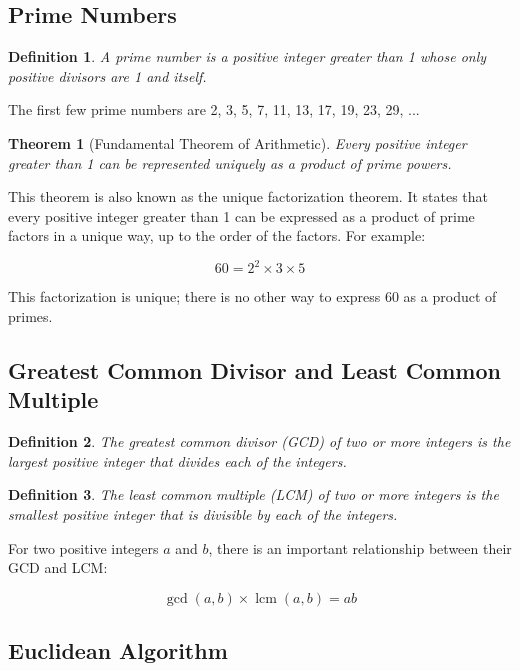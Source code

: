 \documentclass[12pt,a4paper]{article}
\DeclareMathOperator{\lcm}{lcm}
\newtheorem{definition}{Definition}
\newtheorem{theorem}{Theorem}
\begin{document}
\subsection{Prime Numbers}

\begin{definition}
A prime number is a positive integer greater than 1 whose only positive divisors are 1 and itself.
\end{definition}

The first few prime numbers are 2, 3, 5, 7, 11, 13, 17, 19, 23, 29, ...

\begin{theorem}[Fundamental Theorem of Arithmetic]
Every positive integer greater than 1 can be represented uniquely as a product of prime powers.
\end{theorem}

This theorem is also known as the unique factorization theorem. It states that every positive integer greater than 1 can be expressed as a product of prime factors in a unique way, up to the order of the factors. For example:

\[ 60 = 2^2 \times 3 \times 5 \]

This factorization is unique; there is no other way to express 60 as a product of primes.

\subsection{Greatest Common Divisor and Least Common Multiple}

\begin{definition}
The greatest common divisor (GCD) of two or more integers is the largest positive integer that divides each of the integers.
\end{definition}

\begin{definition}
The least common multiple (LCM) of two or more integers is the smallest positive integer that is divisible by each of the integers.
\end{definition}

For two positive integers $a$ and $b$, there is an important relationship between their GCD and LCM:

\[ \gcd(a,b) \times \lcm(a,b) = ab \]

\subsection{Euclidean Algorithm}
\end{document}
